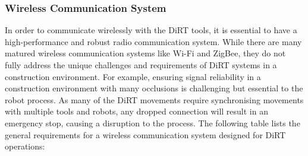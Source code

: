 \documentclass[11pt]{book}
\begin{document}
\subsubsection{Wireless Communication System}

In order to communicate wirelessly with the DiRT tools, it is essential to have a high-performance and robust radio communication system. While there are many matured wireless communication systems like Wi-Fi and ZigBee, they do not fully address the unique challenges and requirements of DiRT systems in a construction environment. For example, ensuring signal reliability in a construction environment with many occlusions is challenging but essential to the robot process. As many of the DiRT movements require synchronising movements with multiple tools and robots, any dropped connection will result in an emergency stop, causing a disruption to the process. The following table lists the general requirements for a wireless communication system designed for DiRT operations:
\end{document}
